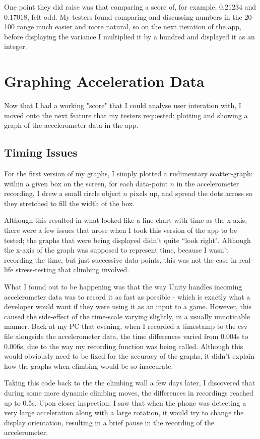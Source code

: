 One point they did raise was that comparing a score of, for example, $0.21234$ and $0.17018$, felt odd.
My testers found comparing and discussing numbers in the 20-100 range much easier and more natural, so on the next iteration of the app, before displaying the variance I multiplied it by a hundred and displayed it as an integer.


\section{Graphing Acceleration Data}
Now that I had a working "score" that I could analyse user interation with, I moved onto the next feature that my testers requested: plotting and showing a graph of the accelerometer data in the app.

\subsection{Timing Issues}
For the first version of my graphs, I simply plotted a rudimentary scatter-graph:
within a given box on the screen, for each data-point $n$ in the accelerometer recording, I drew a small circle object $n$ pixels up, and spread the dots across so they stretched to fill the width of the box.

Although this resulted in what looked like a line-chart with time as the x-axis, there were a few issues that arose when I took this version of the app to be tested;
the graphs that were being displayed didn't quite ``look right".
Although the x-axis of the graph was supposed to represent time, because I wasn't recording the time, but just successive data-points, this was not the case in real-life stress-testing that climbing involved.

What I found out to be happening was that the way Unity handles incoming accelerometer data was to record it as fast as possible - which is exactly what a developer would want if they were using it as an input to a game.
However, this caused the side-effect of the time-scale varying slightly, in a usually unnoticable manner.
Back at my PC that evening, when I recorded a timestamp to the csv file alongside the accelerometer data, the time differences varied from 0.004s to 0.006s, due to the way my recording function was being called.
Although this would obviously need to be fixed for the accuracy of the graphs, it didn't explain how the graphs when climbing would be so inaccurate.

Taking this code back to the the climbing wall a few days later, I discovered that during some more dynamic climbing moves, the differences in recordings reached up to 0.5s.
Upon closer inspection, I saw that when the phone was detecting a very large acceleration along with a large rotation, it would try to change the display orientation, resulting in a brief pause in the recording of the accelerometer.

